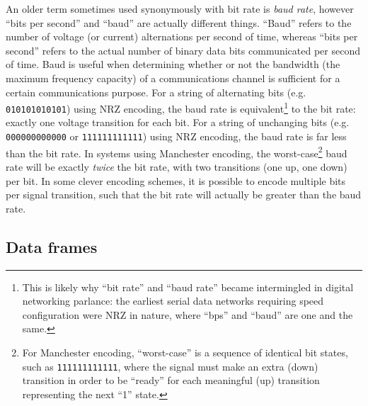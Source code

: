 An older term sometimes used synonymously with bit rate is \textit{baud rate}, however ``bits per second'' and ``baud'' are actually different things.  ``Baud'' refers to the number of voltage (or current) alternations per second of time, whereas ``bits per second'' refers to the actual number of binary data bits communicated per second of time.  Baud is useful when determining whether or not the bandwidth (the maximum frequency capacity) of a communications channel is sufficient for a certain communications purpose.  For a string of alternating bits (e.g. \texttt{010101010101}) using NRZ encoding, the baud rate is equivalent\footnote{This is likely why ``bit rate'' and ``baud rate'' became intermingled in digital networking parlance: the earliest serial data networks requiring speed configuration were NRZ in nature, where ``bps'' and ``baud'' are one and the same.} to the bit rate: exactly one voltage transition for each bit.  For a string of unchanging bits (e.g. \texttt{000000000000} or \texttt{111111111111}) using NRZ encoding, the baud rate is far less than the bit rate.  In systems using Manchester encoding, the worst-case\footnote{For Manchester encoding, ``worst-case'' is a sequence of identical bit states, such as \texttt{111111111111}, where the signal must make an extra (down) transition in order to be ``ready'' for each meaningful (up) transition representing the next ``1'' state.} baud rate will be exactly \textit{twice} the bit rate, with two transitions (one up, one down) per bit.  In some clever encoding schemes, it is possible to encode multiple bits per signal transition, such that the bit rate will actually be greater than the baud rate.  









\filbreak
\subsection{Data frames}

